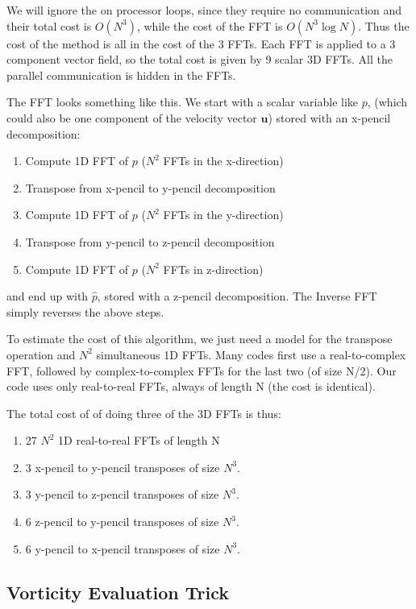 \documentclass[12pt]{article}
\newcommand{\uv}{\mathbf u}
\begin{document}
We will ignore the on processor loops, since they require no
communication and their total cost is $O(N^3)$, while the cost of the
FFT is $O(N^3 \log N)$.   Thus the cost of the method is all in
the cost of the 3 FFTs.  Each FFT is applied to a 3 component
vector field, so the total cost is given by 9 scalar 3D FFTs.  
All the parallel communication is hidden in the FFTs. 

The FFT looks something like this.  We start with a scalar variable
like $p$, (which could also be one component of the velocity vector $\uv$)
stored with an x-pencil decomposition:
\begin{enumerate}
\item Compute 1D FFT of $p$ ($N^2$ FFTs in the x-direction)
\item Transpose from x-pencil to y-pencil decomposition
\item Compute 1D FFT of $p$ ($N^2$ FFTs in the y-direction)
\item Transpose from y-pencil to z-pencil decomposition
\item Compute 1D FFT of $p$ ($N^2$ FFTs in z-direction)
\end{enumerate}
and end up with $\hat p$, stored with a z-pencil decomposition.
The Inverse FFT simply reverses the above steps.  

To estimate the cost of this algorithm, we just need a model for the
transpose operation and $N^2$ simultaneous 1D FFTs.  
Many codes first use a real-to-complex FFT, followed by
complex-to-complex FFTs for the last two (of size N/2).  
Our code uses only real-to-real FFTs, always of length N (the cost
is identical).

The total cost of of doing three of the 3D FFTs is thus:
\begin{enumerate}
\item 27 $N^2$ 1D real-to-real FFTs of length N
\item 3 x-pencil to y-pencil transposes of size $N^3$.  
\item 3 y-pencil to z-pencil transposes of size $N^3$.  
\item 6 z-pencil to y-pencil transposes of size $N^3$.  
\item 6 y-pencil to x-pencil transposes of size $N^3$.  
\end{enumerate}


\subsection{Vorticity Evaluation Trick}
\end{document}
